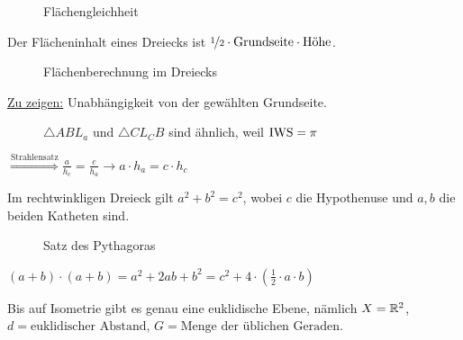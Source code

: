 \begin{figure}[ht]
    \centering
    \subfloat[TODO]{
        
        \label{fig:bild-4}
    }%
    \subfloat[TODO]{
        
        \label{fig:bild-5}
    }%
    \label{fig:flaechengleichheit}
    \caption{Flächengleichheit}
\end{figure}

Der Flächeninhalt eines Dreiecks ist $\nicefrac{1}{2} \cdot \text{Grundseite} \cdot \text{Höhe}$.

\begin{figure}[htp]
    \centering
    
    \caption{Flächenberechnung im Dreiecks}
    \label{fig:flaechenberechnung-dreieck}
\end{figure}

\underline{Zu zeigen:} Unabhängigkeit von der gewählten Grundseite.

\begin{figure}[htp]
    \centering
    
    \caption{$\triangle ABL_a$ und $\triangle C{L_C}B$ sind ähnlich, weil $\operatorname{IWS} = \pi$}
    \label{fig:flaechenberechnung-dreieck-2}
\end{figure}

$\overset{\text{Strahlensatz}}{\Rightarrow} \frac{a}{h_c} = \frac{c}{h_a} \rightarrow a \cdot h_a = c \cdot h_c$

\begin{satz}
    Im rechtwinkligen Dreieck gilt $a^2 + b^2 = c^2$, wobei $c$ die
    Hypothenuse und $a, b$ die beiden Katheten sind.
\end{satz}

\begin{figure}[ht]
    \centering
    \subfloat[Beweisskizze]{
        
        \label{fig:bild-5}
    }%
    \label{fig:flaechengleichheit}
    \caption{Satz des Pythagoras}
\end{figure}

\begin{beweis}
    $(a+b) \cdot (a+b) = a^2 + 2ab + b^2 = c^2 +4 \cdot (\frac{1}{2} \cdot a \cdot b)$
\end{beweis}

\begin{satz}\label{satz:14.13} %
    Bis auf Isometrie gibt es genau eine euklidische Ebene, nämlich
    $X=\mathbb{R}^2$, $d = \text{euklidischer Abstand}$, $G = \text{Menge der üblichen Geraden}$.
\end{satz}

